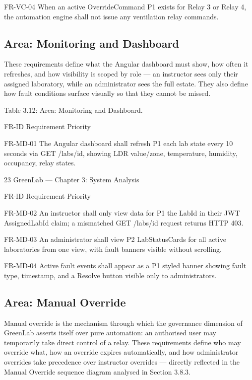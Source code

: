 FR-VC-04 When an active OverrideCommand P1
exists for Relay 3 or Relay 4, the
automation engine shall not issue any
ventilation relay commands.


\subsection{Area: Monitoring and Dashboard}

These requirements define what the Angular dashboard must show, how often it refreshes, and how
visibility is scoped by role --- an instructor sees only their assigned laboratory, while an
administrator sees the full estate. They also define how fault conditions surface visually so that
they cannot be missed.

Table 3.12: Area: Monitoring and Dashboard.

FR-ID Requirement Priority

FR-MD-01 The Angular dashboard shall refresh P1
each lab state every 10 seconds via
GET /labs/{id}, showing LDR
value/zone, temperature, humidity,
occupancy, relay states.




23
GreenLab --- Chapter 3: System Analysis


FR-ID Requirement Priority

FR-MD-02 An instructor shall only view data for P1
the LabId in their JWT AssignedLabId
claim; a mismatched GET /labs/{id}
request returns HTTP 403.

FR-MD-03 An administrator shall view P2
LabStatusCards for all active
laboratories from one view, with fault
banners visible without scrolling.

FR-MD-04 Active fault events shall appear as a P1
styled banner showing fault type,
timestamp, and a Resolve button
visible only to administrators.


\subsection{Area: Manual Override}

Manual override is the mechanism through which the governance dimension of GreenLab asserts
itself over pure automation: an authorised user may temporarily take direct control of a relay.
These requirements define who may override what, how an override expires automatically, and
how administrator overrides take precedence over instructor overrides --- directly reflected in the
Manual Override sequence diagram analysed in Section 3.8.3.

